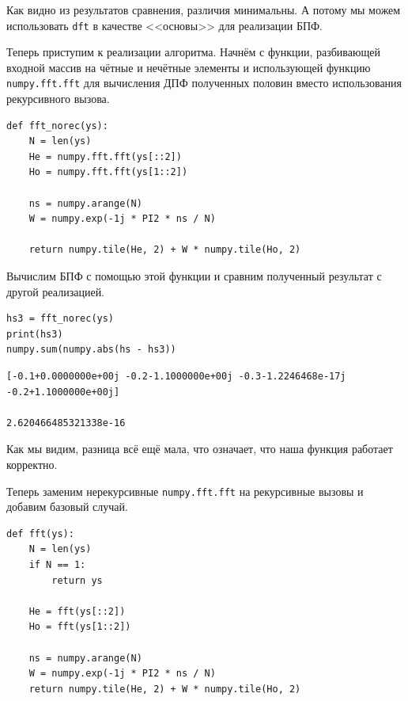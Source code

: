 \documentclass[a4paper, 14pt]{extarticle}
\begin{document}
    Как видно из результатов сравнения, различия минимальны. А потому мы можем использовать \texttt{dft} в качестве
    <<основы>> для реализации БПФ.

    Теперь приступим к реализации алгоритма. Начнём с функции, разбивающей входной массив на чётные и нечётные элементы
    и использующей функцию \texttt{numpy.fft.fft} для вычисления ДПФ полученных половин вместо использования рекурсивного вызова.

    \begin{lstlisting}[caption= Функция \texttt{fft\_norec}., label={lst:task2_fun_fft_norec}]
def fft_norec(ys):
    N = len(ys)
    He = numpy.fft.fft(ys[::2])
    Ho = numpy.fft.fft(ys[1::2])

    ns = numpy.arange(N)
    W = numpy.exp(-1j * PI2 * ns / N)

    return numpy.tile(He, 2) + W * numpy.tile(Ho, 2)    \end{lstlisting}

    Вычислим БПФ с помощью этой функции и сравним полученный результат с другой реализацией.

    \begin{lstlisting}[caption= Сравнение результатов функциий \texttt{fft\_norec} и \texttt{numpy.fft.fft}., label={lst:task2_compare_norec}]
hs3 = fft_norec(ys)
print(hs3)
numpy.sum(numpy.abs(hs - hs3))  \end{lstlisting}

    \begin{lstlisting}[numbers=none, caption= Результаты сравнения., label={lst:task2_dft_res}]
[-0.1+0.0000000e+00j -0.2-1.1000000e+00j -0.3-1.2246468e-17j -0.2+1.1000000e+00j]

2.620466485321338e-16   \end{lstlisting}

    Как мы видим, разница всё ещё мала, что означает, что наша функция работает корректно.

    Теперь заменим нерекурсивные \texttt{numpy.fft.fft} на рекурсивные вызовы и добавим базовый случай.

    \begin{lstlisting}[caption= Функция \texttt{fft} с рекурсивными вызовами., label={lst:task2_fun_fft}]
def fft(ys):
    N = len(ys)
    if N == 1:
        return ys

    He = fft(ys[::2])
    Ho = fft(ys[1::2])

    ns = numpy.arange(N)
    W = numpy.exp(-1j * PI2 * ns / N)
    return numpy.tile(He, 2) + W * numpy.tile(Ho, 2)    \end{lstlisting}
\end{document}
